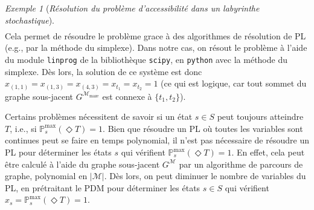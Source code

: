 \documentclass[12pt,a4paper]{report}
\theoremstyle{definition}%
\theoremstyle{remark}
\newtheorem{example}{Exemple}[chapter]
\newcommand{\pr}{\mathbb{P}}
\begin{document}
\begin{example}[\textit{Résolution du problème d'accessibilité dans un labyrinthe stochastique}]
\begin{gather*}
\end{gather*}
Cela permet de résoudre le problème grace à des algorithmes de résolution de
PL (e.g., par la méthode du simplexe).
Dans notre cas, on résout le problème à l'aide du module \verb|linprog|
de la bibliothèque \verb|scipy|, en \verb|python| avec la méthode du simplexe.
Dès lors, la solution de ce
système est donc $x_{(1, 1)} = x_{(1, 3)} = x_{(4, 3)} = x_{t_1} = x_{t_2} = 1$
(ce qui est logique, car tout sommet du graphe sous-jacent $G^{\mathcal{M}_{\text{maze}}}$
est connexe à $\{t_1, t_2 \}$).
\\
\end{example}

Certains problèmes nécessitent de savoir si un état $s \in S$ peut toujours
atteindre $T$, i.e., si $\pr^{\max}_s(\Diamond T) = 1$.
Bien que résoudre un PL où toutes les variables sont continues peut se faire
en temps polynomial, il n'est pas nécessaire de résoudre un PL pour déterminer
les états $s$ qui vérifient $\pr^{\max}_s(\Diamond T) = 1$.
En effet, cela peut être calculé à l'aide du graphe sous-jacent
$G^\mathcal{M}$ par un algorithme de parcours de graphe, polynomial en
$|\mathcal{M}|$. Dès lors, on peut diminuer le nombre de variables du PL, en
prétraitant le PDM pour déterminer les états $s \in S$ qui vérifient
$x_s = \pr^{\max}_s(\Diamond T) = 1$.
\end{document}
